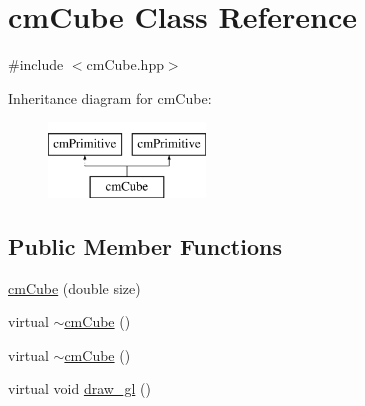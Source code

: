 \hypertarget{classcm_cube}{\section{cm\-Cube Class Reference}
\label{classcm_cube}
}


{\ttfamily \#include $<$cm\-Cube.\-hpp$>$}

Inheritance diagram for cm\-Cube\-:\begin{figure}[H]
\begin{center}
\leavevmode
\includegraphics[height=2.000000cm]{classcm_cube}
\end{center}
\end{figure}
\subsection*{Public Member Functions}
\begin{DoxyCompactItemize}
\item 
\hyperlink{classcm_cube_a4cc5d56d2af01fbcacb558d280910c24}{cm\-Cube} (double size)
\item 
virtual \hyperlink{classcm_cube_a8f61fc33ed30233628db646d7b4fd257}{$\sim$cm\-Cube} ()
\item 
virtual \hyperlink{classcm_cube_a8f61fc33ed30233628db646d7b4fd257}{$\sim$cm\-Cube} ()
\item 
virtual void \hyperlink{classcm_cube_a02219dfc632144663751f14ebcbe42db}{draw\-\_\-gl} ()
\end{DoxyCompactItemize}
